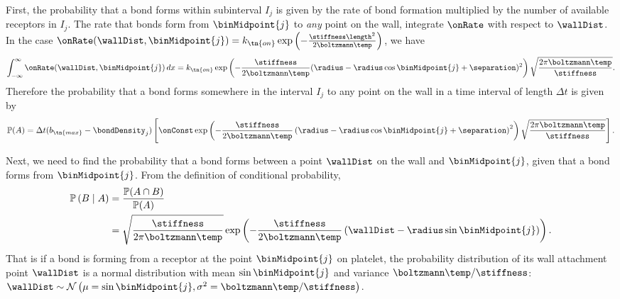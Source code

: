 
First, the probability that a bond forms within subinterval $I_j$ is
given by the rate of bond formation multiplied by the number of
available receptors in $I_j$. The rate that bonds form from
$\binMidpoint{j}$ to \emph{any} point on the wall, integrate $\onRate$
with respect to $\wallDist$. In the case $\onRate(\wallDist,
\binMidpoint{j}) = k_\tn{on} \exp\left(-\frac{\stiffness
    \length^2}{2\boltzmann \temp}\right)$, we have
\begin{equation}
  \label{eq:total_fm_rate}
  \int_{-\infty}^{\infty} \onRate(\wallDist, \binMidpoint{j})\, dx = k_\tn{on} \exp
  \left( -\frac{\stiffness}{2\boltzmann \temp} (\radius - \radius
    \cos\binMidpoint{j} + \separation)^2 \right) \sqrt{\frac{2 \pi
      \boltzmann \temp}{\stiffness}}.
\end{equation}
Therefore the probability that a bond forms somewhere in the interval
$I_j$ to any point on the wall in a time interval of length $\Delta t$
is given by 
\begin{equation}
  \label{eq:form-prob}
  \mathbb{P}(A) = \Delta t (b_\tn{max} - \bondDensity_j) \left[ \onConst
    \exp \left( - \frac{\stiffness}{2 \boltzmann \temp} \left( \radius
        - \radius\cos\binMidpoint{j} + \separation \right)^2 \right)
    \sqrt{\frac{2\pi \boltzmann \temp}{\stiffness}} \right].
\end{equation}

Next, we need to find the probability that a bond forms between a
point $\wallDist$ on the wall and $\binMidpoint{j}$, given that a bond forms from
$\binMidpoint{j}$. From the definition of conditional probability,
\begin{align}
  \mathbb{P} \left( B \mid A \right) 
  &= \frac{\mathbb{P}(A \cap B)}
  {\mathbb{P}(A)} \nonumber \\
  \label{eq:wall-distr}
  &= \sqrt{\frac{\stiffness}{2\pi \boltzmann\temp}} \exp
    \left(-\frac{\stiffness}{2 \boltzmann \temp} \left(\wallDist -
    \radius \sin{\binMidpoint{j}} \right) \right).
\end{align}
That is if a bond is forming from a receptor at the point
$\binMidpoint{j}$ on platelet, the probability distribution of its wall
attachment point $\wallDist$ is a normal distribution with mean
$\sin\binMidpoint{j}$ and variance $\boltzmann\temp/\stiffness$:
$\wallDist \sim \mathcal{N} \left(\mu=\sin\binMidpoint{j},
  \sigma^2 = \boltzmann\temp/\stiffness \right)$.

